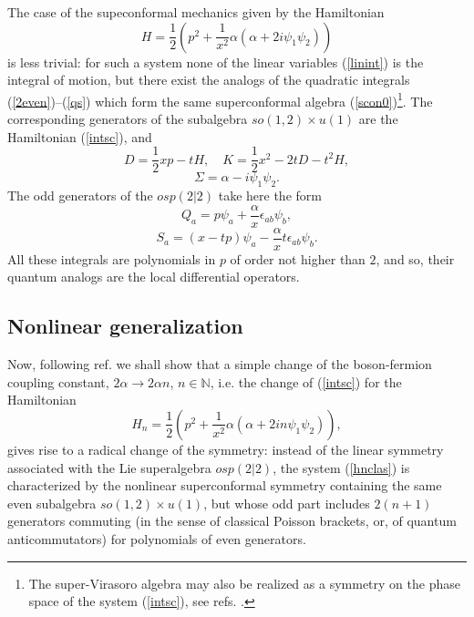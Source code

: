 \documentclass[a4paper,12pt]{article}
\def\N{\mathbb N}
\begin{document}
The case of the supeconformal mechanics
given by the Hamiltonian
\begin{equation}
H=\frac{1}{2}\left(p^2+\frac{1}{x^2}
\alpha(\alpha+2i\psi_1\psi_2)\right)
\label{intsc}
\end{equation}
is less trivial: for such a system
none of the linear variables (\ref{linint})
is the integral of motion,
but there exist the analogs of the
quadratic integrals (\ref{2even})--(\ref{qs})
which form the same
superconformal algebra (\ref{scon0})\footnote{The
super-Virasoro
algebra may also be realized as a symmetry on the phase
space of the system (\ref{intsc}), see refs.
\cite{Kum,Marc}.}.
The corresponding generators of the
subalgebra $so(1,2)\times u(1)$
are the Hamiltonian (\ref{intsc}), and
\begin{equation}
D=
\frac{1}{2}xp-tH,\quad
K=
\frac{1}{2}x^2-2tD-t^2H,
\label{tdk}
\end{equation}
$$
\Sigma=\alpha-i\psi_1\psi_2.
$$
The odd generators of the $osp(2|2)$
take here the form
\begin{equation}
Q_a=p\psi_a+\frac{\alpha}{x}\epsilon_{ab}\psi_b,
\label{q1}
\end{equation}
\begin{equation}
S_a=(x-tp)\psi_a -\frac{\alpha}{x}t\epsilon_{ab}\psi_b.
\label{s1}
\end{equation}
All these integrals are polynomials in $p$
of order not higher than $2$,
and so, their quantum analogs are the local
differential operators.

\subsection{Nonlinear generalization}
Now, following ref. \cite{P1}
we shall show that a simple change of the
boson-fermion coupling constant,
$2\alpha\rightarrow 2\alpha n$, $n\in \N$,
i.e. the change of (\ref{intsc}) for the Hamiltonian
\begin{equation}
H_n=\frac{1}{2}
\left(p^2+\frac{1}{x^2}\alpha(\alpha+2in\psi_1
\psi_2)\right),
\label{hnclas}
\end{equation}
gives rise to a radical change of
the symmetry:
instead of the linear symmetry associated
with the Lie superalgebra
$osp(2|2)$, the system (\ref{hnclas}) is characterized
by the nonlinear superconformal symmetry
containing the same even subalgebra
$so(1,2)\times u(1)$,
but whose odd part includes  $2(n+1)$ generators
commuting (in the sense of classical Poisson brackets,
or, of quantum anticommutators)
for polynomials of even generators.
\end{document}
